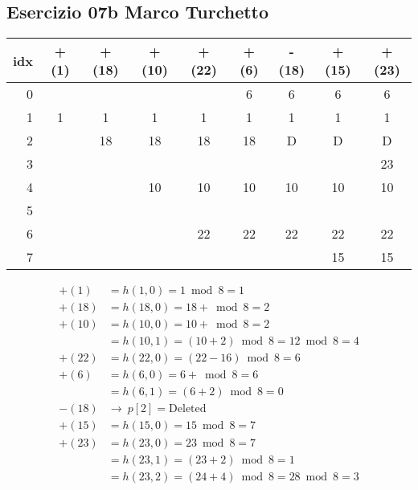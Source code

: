
\subsection[07b MT]{Esercizio 07b Marco Turchetto}

\begin{center}
	\begin{tabular}{r | *{8}{c|}}
		idx & +(1) & +(18) & +(10) & +(22) & +(6) & -(18) & +(15) & +(23) \\ \hline
		0   &      &       &       &       &    6 &     6 &     6 &    6  \\ \cline{2-9}
		1   &    1 &     1 &     1 &     1 &    1 &     1 &     1 &    1  \\ \cline{2-9}
		2   &      &    18 &    18 &    18 &   18 &     D &     D &    D  \\ \cline{2-9}
		3   &      &       &       &       &      &       &       &   23  \\ \cline{2-9}
		4   &      &       &    10 &    10 &   10 &    10 &    10 &   10  \\ \cline{2-9}
		5   &      &       &       &       &      &       &       &       \\ \cline{2-9}
		6   &      &       &       &    22 &   22 &    22 &    22 &   22  \\ \cline{2-9}
		7   &      &       &       &       &      &       &    15 &   15  \\ \cline{2-9}
	\end{tabular}
\end{center}

\begin{align*}
	+(1)  &= h(1,0)  = 1 \bmod 8 = 1 \\
	+(18) &= h(18,0) = 18 + \bmod 8 = 2 \\
	+(10) &= h(10,0) = 10 + \bmod 8 = 2 \\
		  &= h(10,1) = (10 + 2) \bmod 8 = 12 \bmod 8 = 4 \\
	+(22) &= h(22,0) = (22 - 16) \bmod 8 = 6 \\
	+(6)  &= h(6,0)  = 6 + \bmod 8 = 6 \\
		  &= h(6,1)  = (6 + 2) \bmod 8 = 0 \\
	-(18) &\rightarrow \ p[2] = \text{Deleted} \\
	+(15) &= h(15,0) = 15 \bmod 8 = 7 \\
	+(23) &= h(23,0) = 23 \bmod 8 = 7 \\
		  &= h(23,1) = (23 + 2) \bmod 8 = 1 \\
		  &= h(23,2) = (24 + 4) \bmod 8= 28 \bmod 8 = 3 \\
\end{align*} 
